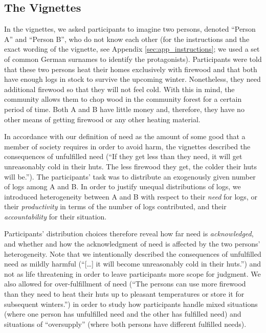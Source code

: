 \documentclass[smallcondensed]{svjour3}
\begin{document}
\subsection{The Vignettes}\label{sec:vignettes}
%
In the vignettes, we asked participants to imagine two persons, denoted ``Person A'' and ``Person B'', who do not know each other (for the instructions and the exact wording of the vignette, see Appendix \ref{sec:app_instructions}; we used a set of common German surnames to identify the protagonists). Participants were told that these two persons heat their homes exclusively with firewood and that both have enough logs in stock to survive the upcoming winter. Nonetheless, they need additional firewood so that they will not feel cold. With this in mind, the community allows them to chop wood in the community forest for a certain period of time. Both A and B have little money and, therefore, they have no other means of getting firewood or any other heating material.\par
%
In accordance with our definition of need as the amount of some good that a member of society requires in order to avoid harm, the vignettes described the consequences of unfulfilled need (``If they get less than they need, it will get unreasonably cold in their huts. The less firewood they get, the colder their huts will be.''). The participants' task was to distribute an exogenously given number of logs among A and B. In order to justify unequal distributions of logs, we introduced heterogeneity between A and B with respect to their \textit{need} for logs, or their \textit{productivity} in terms of the number of logs contributed, and their \textit{accountability} for their situation.\par
%
Participants' distribution choices therefore reveal how far need is \textit{acknowledged}, and whether and how the acknowledgment of need is affected by the two persons' heterogeneity. Note that we intentionally described the consequences of unfulfilled need as mildly harmful (``[\ldots] it will become unreasonably cold in their huts.'') and not as life threatening in order to leave participants more scope for judgment. We also allowed for over-fulfillment of need (``The persons can use more firewood than they need to heat their huts up to pleasant temperatures or store it for subsequent winters.'') in order to study how participants handle mixed situations (where one person has unfulfilled need and the other has fulfilled need) and situations of ``oversupply'' (where both persons have different fulfilled needs).\par
\end{document}
